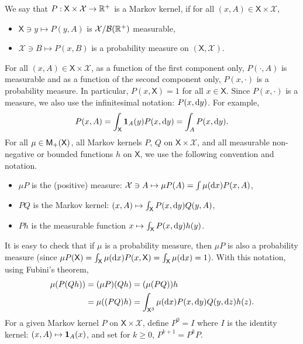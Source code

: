 \documentclass[english,graybox,envcountchap,envcountsame,sectrefs,shortlabels]{svmono}
\theoremstyle{style}
\newcommand{\Yset}{\mathsf{Y}}
\newcommand{\Ysigma}{\mathcal{Y}}
\newcommand{\eqsp}{}
\newcommand{\Xset}{\mathsf{X}}
\newcommand{\Xsigma}{\mathcal{X}}
\begin{document}
\begin{definition}
We say that $P:\Xset\times\Xsigma\to\rset^{+}$
is a Markov kernel, if for all $(x,A)\in\Xset\times\Xsigma$,
\begin{itemize}
\item $\Xset\ni y\mapsto P(y,A)$ is $\Xsigma/\mcbb(\rset^{+})$ measurable,
\item $\Xsigma\ni B\mapsto P(x,B)$ is a probability measure on $(\Xset,\Xsigma)$.
\end{itemize}
\end{definition}
For all $(x,A)\in\Xset\times\Xsigma$, as a function
of the first component only, $P(\cdot,A)$ is measurable and as a
function of the second component only, $P(x,\cdot)$ is a probability
measure. In particular, $P(x,\Xset)=1$ for all $x\in\Xset$. Since
$P(x,\cdot)$ is a measure, we also use the infinitesimal notation:
$P(x,\mathrm{d} y)$. For example, 
$$
P(x,A)=\int_{\Xset}\indi A(y)P(x,\rmd y)=\int_{A}P(x,\rmd y)\eqsp.
$$
For all $\mu\in\meas +(\Xset)$, all Markov kernels $P$, $Q$ on
$\Xset\times\Xsigma$, and all measurable non-negative or bounded
functions $h$ on $\Xset$, we use the following convention and
notation.
\begin{itemize}
\item $\mu P$ is the (positive) measure: $\Xsigma\ni A\mapsto\mu P(A)=\int\mu(\rmd x)P(x,A)$,
\item $PQ$ is the Markov kernel: $(x,A)\mapsto\int_{\Xset}P(x,\rmd y)Q(y,A)$,
\item $Ph$ is the measurable function $x\mapsto\int_{\Xset}P(x,\rmd y)h(y)$.
\end{itemize}
It is easy to check that if $\mu$ is a probability measure, then
$\mu P$ is also a probability measure (since $\mu P(\Xset)=\int_{\Xset}\mu(\rmd x)P(x,\Xset)=\int_{\Xset}\mu(\rmd x)=1$).
With this notation, using Fubini's theorem,
\begin{align*}
\mu(P(Qh)) & =(\mu P)(Qh)=(\mu(PQ))h\\
 & =\mu((PQ)h)=\int_{\Xset^{3}}\mu(\rmd x)P(x,\rmd y)Q(y,\rmd z)h(z).
\end{align*}
For a given
Markov kernel $P$ on $\Xset\times\Xsigma$, define $P^{0}=I$ where
$I$ is the identity kernel: $(x,A)\mapsto\mathbf{1}_{A}(x)$, and set for
$k\geq0$, $P^{k+1}=P^{k}P$.
\end{document}
